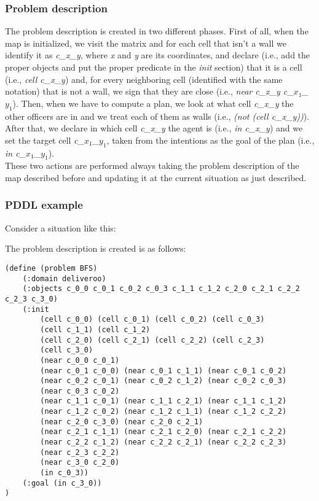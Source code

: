 \documentclass[a4paper, 11pt]{article}
\begin{document}
\subsubsection{Problem description}

The problem description is created in two different phases.
First of all, when the map is initialized, we visit the matrix and for each cell that isn't a wall we identify it as \emph{c\_x\_y}, where \emph{x} and \emph{y} are its coordinates, and declare (i.e., add the proper objects and put the proper predicate in the \emph{init} section) that it is a cell (i.e., \emph{cell c\_x\_y}) and, for every neighboring cell (identified with the same notation) that is not a wall, we sign that they are close (i.e., \emph{near c\_x\_y c\_\(x_1\)\_\(y_1\)}).
Then, when we have to compute a plan, we look at what cell \emph{c\_x\_y} the other officers are in and we treat each of them as walls (i.e., \emph{(not (cell c\_x\_y))}). After that, we declare in which cell \emph{c\_x\_y} the agent is (i.e., \emph{in c\_x\_y}) and we set the target cell \emph{c\_\(x_1\)\_\(y_1\)}, taken from the intentions as the goal of the plan (i.e., \emph{in c\_\(x_1\)\_\(y_1\)}).\\
These two actions are performed always taking the problem description of the map described before and updating it at the current situation as just described.

\subsubsection{PDDL example}

Consider a situation like this:

The problem description is created is as follows:
\begin{verbatim}
(define (problem BFS)
    (:domain deliveroo)
    (:objects c_0_0 c_0_1 c_0_2 c_0_3 c_1_1 c_1_2 c_2_0 c_2_1 c_2_2 c_2_3 c_3_0)
    (:init 
        (cell c_0_0) (cell c_0_1) (cell c_0_2) (cell c_0_3)
        (cell c_1_1) (cell c_1_2)
        (cell c_2_0) (cell c_2_1) (cell c_2_2) (cell c_2_3)
        (cell c_3_0)
        (near c_0_0 c_0_1)
        (near c_0_1 c_0_0) (near c_0_1 c_1_1) (near c_0_1 c_0_2)
        (near c_0_2 c_0_1) (near c_0_2 c_1_2) (near c_0_2 c_0_3)
        (near c_0_3 c_0_2)
        (near c_1_1 c_0_1) (near c_1_1 c_2_1) (near c_1_1 c_1_2)
        (near c_1_2 c_0_2) (near c_1_2 c_1_1) (near c_1_2 c_2_2)
        (near c_2_0 c_3_0) (near c_2_0 c_2_1)
        (near c_2_1 c_1_1) (near c_2_1 c_2_0) (near c_2_1 c_2_2)
        (near c_2_2 c_1_2) (near c_2_2 c_2_1) (near c_2_2 c_2_3)
        (near c_2_3 c_2_2)
        (near c_3_0 c_2_0)
        (in c_0_3))
    (:goal (in c_3_0))
)
\end{verbatim}
\end{document}
